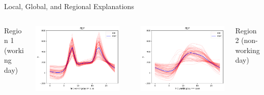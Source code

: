\documentclass[11pt,compress,t,notes=noshow, aspectratio=169, xcolor=table]{beamer}
\begin{document}
\begin{frame}{Local, Global, and Regional Explanations}
\begin{columns}[c, totalwidth=\textwidth]
    \begin{column}{0.125\textwidth}
    \centering
    \scriptsize Region 1 (working day)
    \end{column}
    \begin{column}{0.37\textwidth}
\includegraphics[trim=0 0 0 20, clip, width=\textwidth]{figure/01_bike_sharing_dataset_28_1.png}
    \end{column}
    \begin{column}{0.01\textwidth}
    \end{column}
    \begin{column}{0.37\textwidth}
\includegraphics[trim=0 0 0 20, clip, width=\textwidth]{figure/01_bike_sharing_dataset_28_0.png}
    \end{column}
    \begin{column}{0.125\textwidth}
    \centering
        \scriptsize Region 2 (non-working day)
    \end{column}
\end{columns}
\end{frame}
\end{document}
